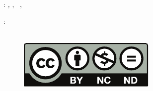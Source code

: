 \thispagestyle{empty}

\hfill

\vfill

\noindent\myName: \textit{\myTitle,} \mySubtitle, %
\textcopyright\ \myLocation, \myTime

\bigskip

\noindent{}: \\
\myProf \\
\begin{figure}[b]
\includegraphics[]{./gfx/Chapter01/by-nc-nd.pdf}
\end{figure}
%
%
%
%
